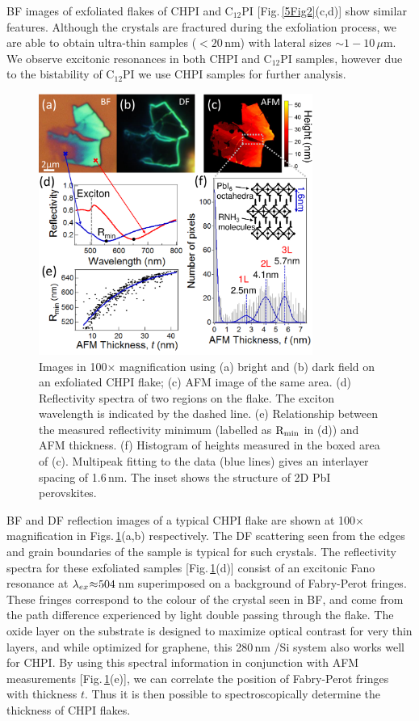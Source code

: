 BF images of exfoliated flakes of CHPI and C$_{12}$PI [Fig.\,\ref{5Fig2}(c,d)] show similar features. Although the crystals are fractured during the exfoliation process, we are able to obtain ultra-thin samples ($<20$\,nm) with lateral sizes $\sim1-10\,\mu$m. We observe excitonic resonances in both CHPI and C$_{12}$PI samples, however due to the bistability of C$_{12}$PI we use CHPI samples for further analysis.
\begin{figure}[h!]
\centering
\includegraphics[width=0.8\textwidth]{Fig3}
\caption{Images in 100$\times$ magnification using (a) bright and (b) dark field on an exfoliated CHPI flake; (c) AFM image of the same area. (d) Reflectivity spectra of two regions on the flake. The exciton wavelength is indicated by the dashed line. (e) Relationship between the measured reflectivity minimum (labelled as $\textnormal{R}_\textnormal{min}$ in (d)) and AFM thickness. (f) Histogram of heights measured in the boxed area of (c). Multipeak fitting to the data (blue lines) gives an interlayer spacing of 1.6\,nm. The inset shows the structure of 2D PbI perovskites.}
\label{5Fig3}
\end{figure}

BF and DF reflection images of a typical CHPI flake are shown at 100$\times$ magnification in Figs.\,\ref{5Fig3}(a,b) respectively. The DF scattering seen from the edges and grain boundaries of the sample is typical for such crystals. The reflectivity spectra for these exfoliated samples [Fig.\,\ref{5Fig3}(d)] consist of an excitonic Fano resonance at $\lambda_{ex}\negmedspace\approx\negmedspace504$\,nm superimposed on a background of Fabry-Perot fringes. These fringes correspond to the colour of the crystal seen in BF, and come from the path difference experienced by light double passing through the flake. The oxide layer on the substrate is designed to maximize optical contrast for very thin layers, and while optimized for graphene, this 280\,nm /Si system also works well for CHPI. By using this spectral information in conjunction with AFM measurements [Fig.\,\ref{5Fig3}(e)], we can correlate the position of Fabry-Perot fringes with thickness $t$. Thus it is then possible to spectroscopically determine the thickness of CHPI flakes.

